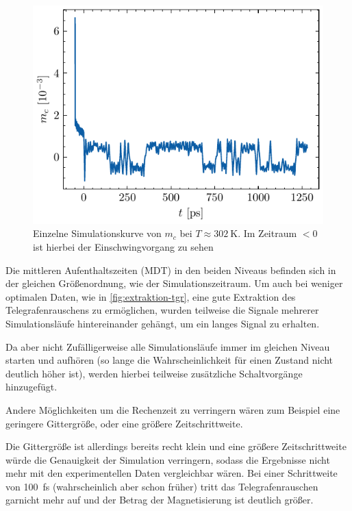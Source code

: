 \documentclass[main.tex]{subfiles}
\begin{document}
\begin{figure}[h]
    \centering
    \includegraphics{bilder/plots/theo-vis/example-telegraph-sim.pdf}
    \caption{Einzelne Simulationskurve von \(m_c\) bei \(T \approx \SI{302}{\kelvin}\). Im Zeitraum \(<0\) ist hierbei der Einschwingvorgang zu sehen 
    }\label{fig:bsp-run}
\end{figure}

Die mittleren Aufenthaltszeiten (MDT) in den beiden Niveaus befinden sich in der gleichen Größenordnung, wie der Simulationszeitraum. Um auch bei weniger optimalen Daten, wie in \cref{fig:extraktion-tgr}, eine gute Extraktion des Telegrafenrauschens zu ermöglichen, wurden teilweise die Signale mehrerer Simulationsläufe hintereinander gehängt, um ein langes Signal zu erhalten.

Da aber nicht Zufälligerweise alle Simulationsläufe immer im gleichen Niveau starten und aufhören (so lange die Wahrscheinlichkeit für einen Zustand nicht deutlich höher ist), werden hierbei teilweise zusätzliche Schaltvorgänge hinzugefügt.


Andere Möglichkeiten um die Rechenzeit zu verringern wären zum Beispiel eine geringere Gittergröße, oder eine größere Zeitschrittweite.

Die Gittergröße ist allerdings bereits recht klein und eine größere Zeitschrittweite würde die Genauigkeit der Simulation verringern, sodass die Ergebnisse nicht mehr mit den experimentellen Daten vergleichbar wären. Bei einer Schrittweite von \SI{100}{\femto\second} (wahrscheinlich aber schon früher) tritt das Telegrafenrauschen garnicht mehr auf und der Betrag der Magnetisierung ist deutlich größer.
\end{document}
